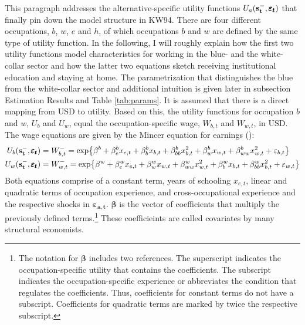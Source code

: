 \noindent
This paragraph addresses the alternative-specific utility functions $U_a(\bold{s_t^-}, \pmb{\varepsilon_t})$ that finally pin down the model structure in KW94. There are four different occupations, $b$, $w$, $e$ and $h$, of which occupations $b$ and $w$ are defined by the same type of utility function. In the following, I will roughly explain how the first two utility functions model characteristics for working in the blue- and the white-collar sector and how the latter two equations sketch receiving institutional education and staying at home. The parametrization that distinguishes the blue from the white-collar sector and additional intuition is given later in subsection Estimation Results and Table \ref{tab:params}. It is assumed that there is a direct mapping from USD to utility. Based on this, the utility functions for occupation $b$ and $w$, $U_b$ and $U_w$, equal the occupation-specific wage, $W_{b,t}$ and $W_{w,t}$, in USD. The wage equations are given by the Mincer equation for earnings (\cite{Mincer.1958}):
\begin{equation} \label{eq:returns_b_w}
\begin{aligned}
U_b(\bold{s_t^-}, \pmb{\varepsilon_t}) &= W_{b,t}^{-} = \text{exp}\big\{\beta^b + \beta_e^b x_{e,t} + \beta_b^b x_{b,t} + \beta_{bb}^b x^2_{b,t} + \beta_w^b x_{w,t} + \beta_{ww}^{b} x^2_{w,t} + \varepsilon_{b,t}\big\} \\
U_w(\bold{s_t^-},\pmb{\varepsilon_t}) &= W_{w,t}^{-} = \text{exp}\big\{\beta^w + \beta_e^w x_{e,t} + \beta_w^w x_{w,t} + \beta_{ww}^w x^2_{w,t} + \beta_b^w x_{b,t} + \beta_{bb}^{w} x^2_{b,t} + \varepsilon_{w,t}\big\}
\end{aligned}
\end{equation}
Both equations comprise of a constant term, years of schooling $x_{e,t}$, linear and quadratic terms of occupation experience, and cross-occupational experience and the  respective shocks in $\pmb{\varepsilon_{a,t}}$. $\pmb{\beta}$ is the vector of coefficients that multiply the previously defined terms.\footnote{The notation for $\pmb{\beta}$ includes two references. The superscript indicates the occupation-specific utility that contains the coefficients. The subscript indicates the occupation-specific experience or abbreviates the condition that regulates the coefficients. Thus, coefficients for constant terms do not have a subscript. Coefficients for quadratic terms are marked by twice the respective subscript.} These coefficieints are called covariates by many structural economists.

